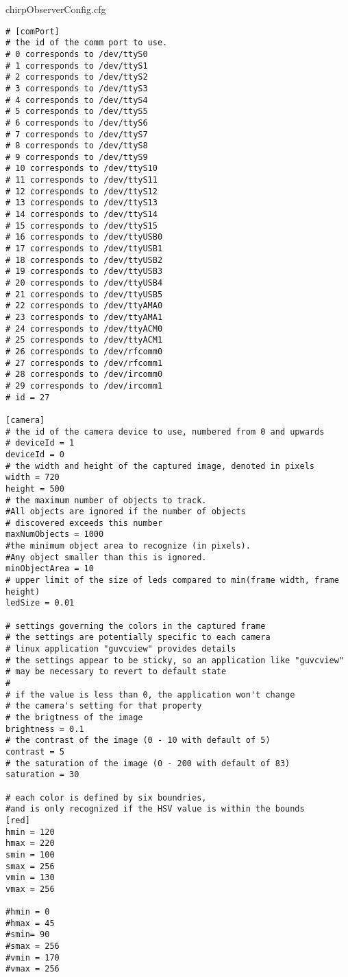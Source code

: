 chirpObserverConfig.cfg
\begin{lstlisting}
# [comPort]
# the id of the comm port to use. 
# 0 corresponds to /dev/ttyS0 
# 1 corresponds to /dev/ttyS1
# 2 corresponds to /dev/ttyS2
# 3 corresponds to /dev/ttyS3
# 4 corresponds to /dev/ttyS4
# 5 corresponds to /dev/ttyS5
# 6 corresponds to /dev/ttyS6
# 7 corresponds to /dev/ttyS7
# 8 corresponds to /dev/ttyS8
# 9 corresponds to /dev/ttyS9
# 10 corresponds to /dev/ttyS10
# 11 corresponds to /dev/ttyS11
# 12 corresponds to /dev/ttyS12
# 13 corresponds to /dev/ttyS13
# 14 corresponds to /dev/ttyS14
# 15 corresponds to /dev/ttyS15
# 16 corresponds to /dev/ttyUSB0
# 17 corresponds to /dev/ttyUSB1
# 18 corresponds to /dev/ttyUSB2
# 19 corresponds to /dev/ttyUSB3
# 20 corresponds to /dev/ttyUSB4
# 21 corresponds to /dev/ttyUSB5
# 22 corresponds to /dev/ttyAMA0
# 23 corresponds to /dev/ttyAMA1
# 24 corresponds to /dev/ttyACM0
# 25 corresponds to /dev/ttyACM1
# 26 corresponds to /dev/rfcomm0
# 27 corresponds to /dev/rfcomm1
# 28 corresponds to /dev/ircomm0
# 29 corresponds to /dev/ircomm1
# id = 27

[camera]
# the id of the camera device to use, numbered from 0 and upwards
# deviceId = 1
deviceId = 0
# the width and height of the captured image, denoted in pixels
width = 720	
height = 500
# the maximum number of objects to track. 
#All objects are ignored if the number of objects
# discovered exceeds this number
maxNumObjects = 1000
#the minimum object area to recognize (in pixels). 
#Any object smaller than this is ignored.
minObjectArea = 10
# upper limit of the size of leds compared to min(frame width, frame height)
ledSize = 0.01

# settings governing the colors in the captured frame
# the settings are potentially specific to each camera
# linux application "guvcview" provides details
# the settings appear to be sticky, so an application like "guvcview"
# may be necessary to revert to default state
#
# if the value is less than 0, the application won't change
# the camera's setting for that property
# the brigtness of the image
brightness = 0.1
# the contrast of the image (0 - 10 with default of 5)
contrast = 5
# the saturation of the image (0 - 200 with default of 83)
saturation = 30

# each color is defined by six boundries,
#and is only recognized if the HSV value is within the bounds
[red]
hmin = 120
hmax = 220
smin = 100
smax = 256
vmin = 130
vmax = 256

#hmin = 0
#hmax = 45
#smin= 90
#smax = 256
#vmin = 170
#vmax = 256


\end{lstlisting}
